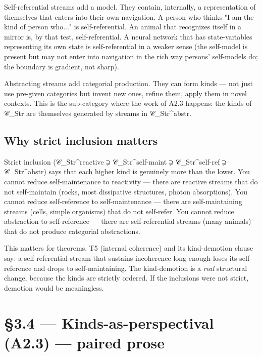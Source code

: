 \documentclass[11pt, openany]{book}
\newcommand{\sectionbreak}{\clearpage}
\begin{document}
Self-referential streams add a model. They contain, internally, a representation of themselves that enters into their own navigation. A person who thinks "I am the kind of person who..." is self-referential. An animal that recognizes itself in a mirror is, by that test, self-referential. A neural network that has state-variables representing its own state is self-referential in a weaker sense (the self-model is present but may not enter into navigation in the rich way persons' self-models do; the boundary is gradient, not sharp).

Abstracting streams add categorial production. They can form kinds --- not just use pre-given categories but invent new ones, refine them, apply them in novel contexts. This is the sub-category where the work of A2.3 happens: the kinds of 𝒞\_\allowbreak{}Str are themselves generated by streams in 𝒞\_\allowbreak{}Str\textasciicircum{}abstr.

\subsection{Why strict inclusion matters}

Strict inclusion (𝒞\_\allowbreak{}Str\textasciicircum{}reactive ⊋ 𝒞\_\allowbreak{}Str\textasciicircum{}self-maint ⊋ 𝒞\_\allowbreak{}Str\textasciicircum{}self-ref ⊋ 𝒞\_\allowbreak{}Str\textasciicircum{}abstr) says that each higher kind is genuinely more than the lower. You cannot reduce self-maintenance to reactivity --- there are reactive streams that do not self-maintain (rocks, most dissipative structures, photon absorptions). You cannot reduce self-reference to self-maintenance --- there are self-maintaining streams (cells, simple organisms) that do not self-refer. You cannot reduce abstraction to self-reference --- there are self-referential streams (many animals) that do not produce categorial abstractions.

This matters for theorems. T5 (internal coherence) and its kind-demotion clause say: a self-referential stream that sustains incoherence long enough loses its self-reference and drops to self-maintaining. The kind-demotion is a \textit{real} structural change, because the kinds are strictly ordered. If the inclusions were not strict, demotion would be meaningless.

\sectionbreak

\section{§3.4 --- Kinds-as-perspectival (A2.3) --- paired prose}
\end{document}
